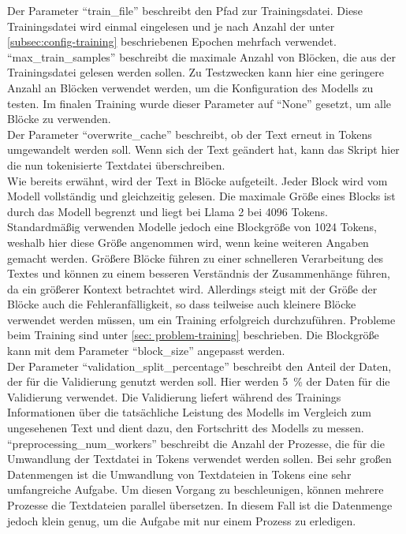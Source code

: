 Der Parameter \enquote{train\_file} beschreibt den Pfad zur Trainingsdatei.
Diese Trainingsdatei wird einmal eingelesen und je nach Anzahl der unter \cref{subsec:config-training} beschriebenen Epochen mehrfach verwendet.\\

\enquote{max\_train\_samples} beschreibt die maximale Anzahl von Blöcken, die aus der Trainingsdatei gelesen werden sollen.
Zu Testzwecken kann hier eine geringere Anzahl an Blöcken verwendet werden, um die Konfiguration des Modells zu testen.
Im finalen Training wurde dieser Parameter auf \enquote{None} gesetzt, um alle Blöcke zu verwenden.\\

Der Parameter \enquote{overwrite\_cache} beschreibt, ob der Text erneut in Tokens umgewandelt werden soll.
Wenn sich der Text geändert hat, kann das Skript hier die nun tokenisierte Textdatei überschreiben.\\

Wie bereits erwähnt, wird der Text in Blöcke aufgeteilt.
Jeder Block wird vom Modell vollständig und gleichzeitig gelesen.
Die maximale Größe eines Blocks ist durch das Modell begrenzt und liegt bei Llama 2 bei 4096 Tokens.
Standardmäßig verwenden Modelle jedoch eine Blockgröße von 1024 Tokens, weshalb hier diese Größe angenommen wird, wenn keine weiteren Angaben gemacht werden.
Größere Blöcke führen zu einer schnelleren Verarbeitung des Textes und können zu einem besseren Verständnis der Zusammenhänge führen, da ein größerer Kontext betrachtet wird.
Allerdings steigt mit der Größe der Blöcke auch die Fehleranfälligkeit, so dass teilweise auch kleinere Blöcke verwendet werden müssen, um ein Training erfolgreich durchzuführen.
Probleme beim Training sind unter \cref{sec: problem-training} beschrieben.
Die Blockgröße kann mit dem Parameter \enquote{block\_size} angepasst werden.\\

Der Parameter \enquote{validation\_split\_percentage} beschreibt den Anteil der Daten, der für die Validierung genutzt werden soll.
Hier werden \SI{5}{\percent} der Daten für die Validierung verwendet.
Die Validierung liefert während des Trainings Informationen über die tatsächliche Leistung des Modells im Vergleich zum ungesehenen Text und dient dazu, den Fortschritt des Modells zu messen.\\

\enquote{preprocessing\_num\_workers} beschreibt die Anzahl der Prozesse, die für die Umwandlung der Textdatei in Tokens verwendet werden sollen.
Bei sehr großen Datenmengen ist die Umwandlung von Textdateien in Tokens eine sehr umfangreiche Aufgabe.
Um diesen Vorgang zu beschleunigen, können mehrere Prozesse die Textdateien parallel übersetzen.
In diesem Fall ist die Datenmenge jedoch klein genug, um die Aufgabe mit nur einem Prozess zu erledigen.\\

